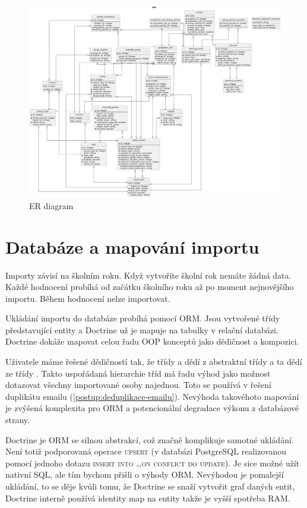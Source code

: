 \begin{figure}
	\centering
  \includegraphics[width=1\textwidth]{Figures/database.png}
  \caption{ER diagram}
  \label{postup:er-diagram}
\end{figure}



\section{Databáze a mapování importu}

Importy závisí na školním roku.
Když vytvoříte školní rok nemáte žádná data.
Každé hodnocení probíhá od začátku školního roku až po moment nejnovějšího importu.
Během hodnocení nelze importovat.

Ukládání importu do databáze probíhá pomocí ORM.
Jsou vytvořené třídy představující entity a Doctrine už je mapuje na tabulky v relační databázi.
Doctrine dokáže mapovat celou řadu OOP konceptů jako dědičnost a kompozici.

Uživatele máme řešené dědičností tak, že třídy  a  dědí z abstraktní třídy  a ta dědí ze třídy .
Takto uspořádaná hierarchie tříd má řadu výhod jako možnost dotazovat všechny importované osoby najednou.
Toto se používá v řešení duplikátu emailu (\ref{postup:deduplikace-emailu}).
Nevýhoda takovéhoto mapování je zvýšená komplexita pro ORM a potencionální degradace výkonu z databázové strany.

Doctrine je ORM se silnou abstrakcí, což značně komplikuje samotné ukládání.
Není totiž podporovaná operace \textsc{upsert} (v databázi PostgreSQL realizovanou pomocí jednoho dotazu \textsc{insert into \dots  on conflict do update}).
Je sice možné užít nativní SQL, ale tím bychom přišli o výhody ORM.
Nevýhodou je pomalejší ukládání, to se děje kvůli tomu, že Doctrine se snaží vytvořit graf daných entit, Doctrine interně používá identity map na entity takže je vyšší spotřeba RAM.

